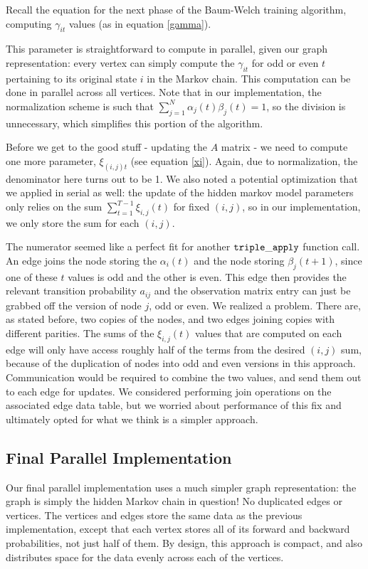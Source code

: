 Recall the equation for the next phase of the Baum-Welch training algorithm, computing $\gamma_{it}$ values (as in equation \ref{gamma}).

This parameter is straightforward to compute in parallel, given our graph representation: every vertex can simply compute the $\gamma_{it}$ for odd or even $t$ pertaining to its original state $i$ in the Markov chain.  This computation can be done in parallel across all vertices.   Note that in our implementation, the normalization scheme is such that $\sum_{j = 1}^N \alpha_{j}(t)\beta_{j}(t) = 1$, so the division is unnecessary, which simplifies this portion of the algorithm.

Before we get to the good stuff - updating the $A$ matrix - we need to compute one more parameter, $\xi_{(i,j)t}$ (see equation \ref{xi}).
Again, due to normalization, the denominator here turns out to be 1.  We also
noted a potential optimization that we applied in serial as well: the update of
the hidden markov model parameters only relies on the sum $\sum_{t = 1}^{T-1}
\xi_{i,j}(t) $ for fixed $(i, j)$, so in our implementation, we only store the sum for each $(i, j)$.

The numerator seemed like a perfect fit for another $\tt{triple\_apply}$
function call.  An edge joins the node storing the $\alpha_{i}(t)$ and the node
storing $\beta_{j}(t+1)$, since one of these $t$ values is odd and the other is
even.  This edge then provides the relevant transition probability $a_{ij}$ and
the observation matrix entry can just be grabbed off the version of node $j$,
odd or even.  We realized a problem. There are, as stated before, two copies of
the nodes, and two edges joining copies with different parities.  The sums of
the $\xi_{i,j}(t)$ values that are computed on each edge will only have access roughly half of the terms from the desired $(i, j)$ sum, because of the duplication of nodes into odd and even versions in this approach.  Communication would be required to combine the two values, and send them out to each edge for updates.  We considered performing join operations on the associated edge data table, but we worried about performance of this fix and ultimately opted for what we think is a simpler approach.

\subsection{Final Parallel Implementation}

Our final parallel implementation uses a much simpler graph representation: the graph is simply the hidden Markov chain in question! No duplicated edges or vertices.  The vertices and edges store the same data as the previous implementation, except that each vertex stores all of its forward and backward probabilities, not just half of them.  By design, this approach is compact, and also distributes space for the data evenly across each of the vertices.

